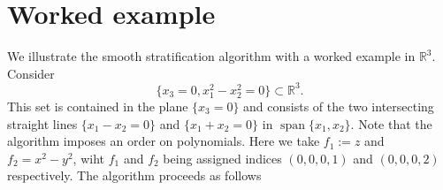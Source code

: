 \documentclass[
]{book}
\theoremstyle{definition}
\theoremstyle{definition}
\theoremstyle{definition}
\theoremstyle{definition}
\theoremstyle{remark}
\begin{document}
\hypertarget{sec:strat-worked-example}{%
\section{Worked example}\label{sec:strat-worked-example}}

We illustrate the smooth stratification algorithm with a worked example in \(\mathbb{R}^3\). Consider
\[
\{ x_3 = 0, x_1^2-x_2^2=0 \} \subset \mathbb{R}^3.
\]
This set is contained in the plane \(\{ x_3 = 0 \}\) and consists of the two intersecting straight lines \(\{ x_1 - x_2 = 0 \}\) and \(\{ x_1 + x_2 = 0 \}\) in \({\operatorname{span} \{x_1,x_2\}}\).
Note that the algorithm imposes an order on polynomials. Here we take \(f_1 := z\) and \(f_2 = x^2 - y^2\), wiht \(f_1\) and \(f_2\) being assigned indices \((0,0,0,1)\) and \((0,0,0,2)\) respectively.
The algorithm proceeds as follows
\end{document}
